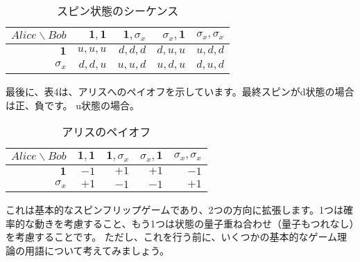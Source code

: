\begin{table}[htb]
\caption{スピン状態のシーケンス}
\centering
  \begin{tabular}{|r||r|r|r|r|} \hline
    $Alice \backslash Bob$ & $\mathbf{1}, \mathbf{1}$  &  $\mathbf{1}, \sigma_x $  & $ \sigma_x,\mathbf{1} $ & $\sigma_x, \sigma_x $  \\ \hline \hline
    $\mathbf{1}$ & $u,u,u$ & $d,d,d$ & $d,u,u$ & $u,d,d$ \\
    $\sigma_x$   & $d,d,u$ & $u,u,d$ & $u,d,u$ & $d,u,d$ \\ \hline
  \end{tabular}
\end{table}


最後に、表4は、アリスへのペイオフを示しています。最終スピンがd状態の場合は正、負です。
u状態の場合。

\begin{table}[htb]
\caption{アリスのペイオフ}
\centering
  \begin{tabular}{|r||r|r|r|r|} \hline
    $Alice \backslash Bob$ & $\mathbf{1}, \mathbf{1}$  &  $\mathbf{1}, \sigma_x $  & $ \sigma_x,\mathbf{1} $ & $\sigma_x, \sigma_x $  \\ \hline \hline
    $\mathbf{1}$ & $-1$ & $+1$ & $+1$ & $-1$ \\
    $\sigma_x$   & $+1$ & $-1$ & $-1$ & $+1$ \\ \hline
  \end{tabular}
\end{table}


これは基本的なスピンフリップゲームであり、2つの方向に拡張します。1つは確率的な動きを考慮すること、もう1つは状態の量子重ね合わせ（量子もつれなし）を考慮することです。 ただし、これを行う前に、いくつかの基本的なゲーム理論の用語について考えてみましょう。


